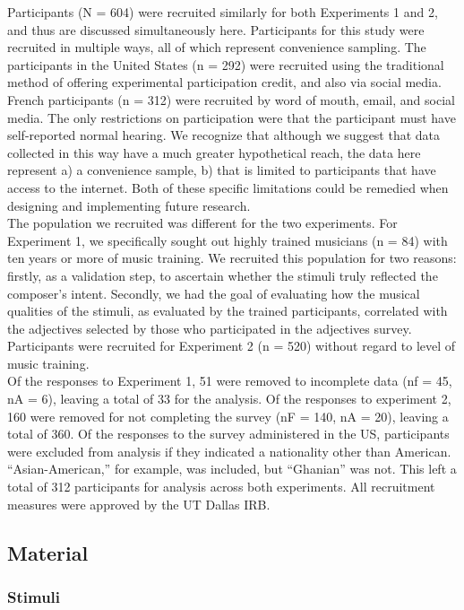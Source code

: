 \documentclass[
  english,
  man,floatsintext]{apa6}
\begin{document}
Participants (N = 604) were recruited similarly for both Experiments 1 and 2, and thus are discussed simultaneously here. Participants for this study were recruited in multiple ways, all of which represent convenience sampling. The participants in the United States (n = 292) were recruited using the traditional method of offering experimental participation credit, and also via social media. French participants (n = 312) were recruited by word of mouth, email, and social media. The only restrictions on participation were that the participant must have self-reported normal hearing. We recognize that although we suggest that data collected in this way have a much greater hypothetical reach, the data here represent a) a convenience sample, b) that is limited to participants that have access to the internet. Both of these specific limitations could be remedied when designing and implementing future research.\\
The population we recruited was different for the two experiments. For Experiment 1, we specifically sought out highly trained musicians (n = 84) with ten years or more of music training. We recruited this population for two reasons: firstly, as a validation step, to ascertain whether the stimuli truly reflected the composer's intent. Secondly, we had the goal of evaluating how the musical qualities of the stimuli, as evaluated by the trained participants, correlated with the adjectives selected by those who participated in the adjectives survey. Participants were recruited for Experiment 2 (n = 520) without regard to level of music training.\\
Of the responses to Experiment 1, 51 were removed to incomplete data (nf = 45, nA = 6), leaving a total of 33 for the analysis. Of the responses to experiment 2, 160 were removed for not completing the survey (nF = 140, nA = 20), leaving a total of 360. Of the responses to the survey administered in the US, participants were excluded from analysis if they indicated a nationality other than American. ``Asian-American,'' for example, was included, but ``Ghanian'' was not. This left a total of 312 participants for analysis across both experiments.
All recruitment measures were approved by the UT Dallas IRB.

\hypertarget{material}{%
\subsection{Material}\label{material}}

\hypertarget{stimuli}{%
\subsubsection{Stimuli}\label{stimuli}}
\end{document}
